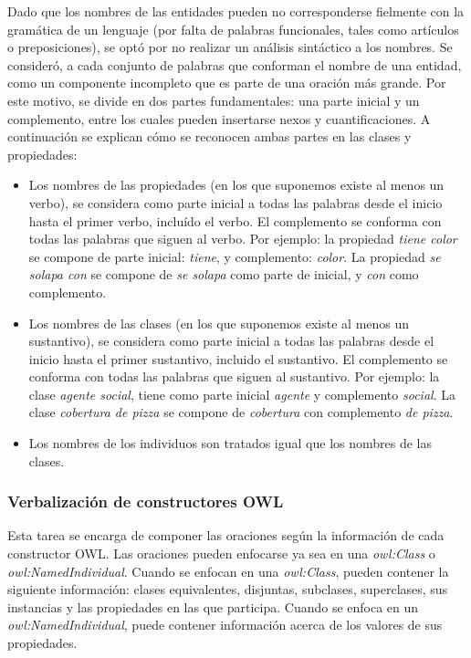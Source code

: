 Dado que los nombres de las entidades pueden no corresponderse fielmente con la gramática de un lenguaje (por falta de palabras funcionales, tales como artículos o preposiciones), se optó por no realizar un análisis sintáctico a los nombres. Se consideró, a cada conjunto de palabras que conforman el nombre de una entidad, como un componente incompleto que es parte de una oración más grande. Por este motivo, se divide en dos partes fundamentales: una parte inicial y un complemento, entre los cuales pueden insertarse nexos y cuantificaciones. A continuación se explican cómo se reconocen ambas partes en las clases y propiedades:
\begin{itemize}
    \item Los nombres de las propiedades (en los que suponemos existe al menos un verbo), se considera como parte inicial a todas las palabras desde el inicio hasta el primer verbo, incluído el verbo. El complemento se conforma con todas las palabras que siguen al verbo. Por ejemplo: la propiedad \emph{tiene color} se compone de parte inicial: \emph{tiene}, y complemento: \emph{color}. La propiedad \emph{se solapa con} se compone de \emph{se solapa} como parte de inicial, y \emph{con} como complemento.
    \item Los nombres de las clases (en los que suponemos existe al menos un sustantivo), se considera como parte inicial a todas las palabras desde el inicio hasta el primer sustantivo, incluido el sustantivo. El complemento se conforma con todas las palabras que siguen al sustantivo. Por ejemplo: la clase \emph{agente social}, tiene como parte inicial \emph{agente} y complemento \emph{social}. La clase \emph{cobertura de pizza} se compone de \emph{cobertura} con complemento \emph{de pizza}.
    \item Los nombres de los individuos son tratados igual que los nombres de las clases.
\end{itemize}


\subsubsection{Verbalización de constructores OWL}
Esta tarea se encarga de componer las oraciones según la información de cada constructor OWL. Las oraciones pueden enfocarse ya sea en una \emph{owl:Class} o  \emph{owl:NamedIndividual}. Cuando se enfocan en una \emph{owl:Class}, pueden contener la siguiente información: clases equivalentes, disjuntas, subclases, superclases, sus instancias y las propiedades en las que participa. Cuando se enfoca en un \emph{owl:NamedIndividual}, puede contener información acerca de los valores de sus propiedades.

